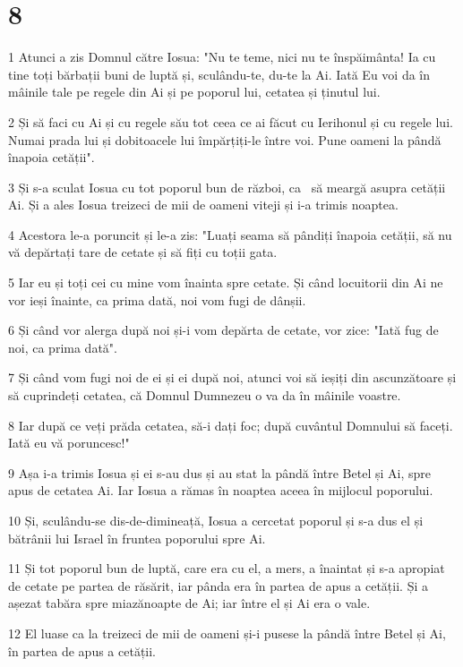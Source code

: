 \chapter{8}

\par 1 Atunci a zis Domnul către Iosua: "Nu te teme, nici nu te înspăimânta! Ia cu tine toți bărbații buni de luptă și, sculându-te, du-te la Ai. Iată Eu voi da în mâinile tale pe regele din Ai și pe poporul lui, cetatea și ținutul lui.
\par 2 Și să faci cu Ai și cu regele său tot ceea ce ai făcut cu Ierihonul și cu regele lui. Numai prada lui și dobitoacele lui împărțiți-le între voi. Pune oameni la pândă înapoia cetății".
\par 3 Și s-a sculat Iosua cu tot poporul bun de război, ca  să meargă asupra cetății Ai. Și a ales Iosua treizeci de mii de oameni viteji și i-a trimis noaptea.
\par 4 Acestora le-a poruncit și le-a zis: "Luați seama să pândiți înapoia cetății, să nu vă depărtați tare de cetate și să fiți cu toții gata.
\par 5 Iar eu și toți cei cu mine vom înainta spre cetate. Și când locuitorii din Ai ne vor ieși înainte, ca prima dată, noi vom fugi de dânșii.
\par 6 Și când vor alerga după noi și-i vom depărta de cetate, vor zice: "Iată fug de noi, ca prima dată".
\par 7 Și când vom fugi noi de ei și ei după noi, atunci voi să ieșiți din ascunzătoare și să cuprindeți cetatea, că Domnul Dumnezeu o va da în mâinile voastre.
\par 8 Iar după ce veți prăda cetatea, să-i dați foc; după cuvântul Domnului să faceți. Iată eu vă poruncesc!"
\par 9 Așa i-a trimis Iosua și ei s-au dus și au stat la pândă între Betel și Ai, spre apus de cetatea Ai. Iar Iosua a rămas în noaptea aceea în mijlocul poporului.
\par 10 Și, sculându-se dis-de-dimineață, Iosua a cercetat poporul și s-a dus el și bătrânii lui Israel în fruntea poporului spre Ai.
\par 11 Și tot poporul bun de luptă, care era cu el, a mers, a înaintat și s-a apropiat de cetate pe partea de răsărit, iar pânda era în partea de apus a cetății. Și a așezat tabăra spre miazănoapte de Ai; iar între el și Ai era o vale.
\par 12 El luase ca la treizeci de mii de oameni și-i pusese la pândă între Betel și Ai, în partea de apus a cetății.

